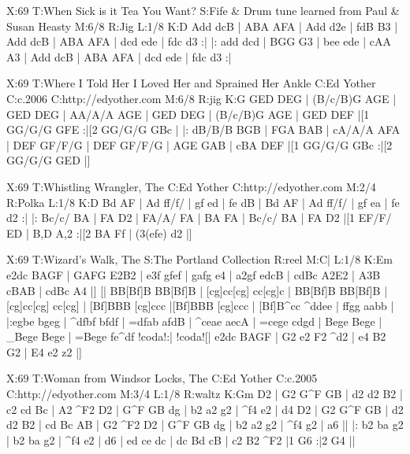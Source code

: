 \documentclass[letterpaper]{article}
\begin{document}
\begin{abc}[name]
X:69
T:When Sick is it Tea You Want?
S:Fife & Drum tune learned from Paul & Susan Heasty
M:6/8
R:Jig
L:1/8
K:D
Add dcB | ABA AFA | Add d2e | fdB B3 |
Add dcB | ABA AFA | dcd ede | fdc d3 :|
|: add dcd | BGG G3 | bee ede | cAA A3 |
Add dcB | ABA AFA | dcd ede | fdc d3 :|
\end{abc}

\begin{abc}[name]
X:69
T:Where I Told Her I Loved Her and Sprained Her Ankle
C:Ed Yother
C:c.2006
C:http://edyother.com
M:6/8
R:jig
K:G
GED DEG | (B/c/B)G AGE | GED DEG | AA/A/A AGE |
GED DEG | (B/c/B)G AGE | GED DEF |[1 GG/G/G GFE :|[2 GG/G/G GBc |
|: dB/B/B BGB | FGA BAB | cA/A/A AFA | DEF GF/F/G |
DEF GF/F/G | AGE GAB | cBA DEF |[1 GG/G/G GBc :|[2 GG/G/G GED |]
\end{abc}

\begin{abc}[name]
X:69
T:Whistling Wrangler, The
C:Ed Yother
C:http://edyother.com
M:2/4
R:Polka
L:1/8
K:D
Bd AF | Ad ff/f/ | gf ed | fe dB |
Bd AF | Ad ff/f/ | gf ea | fe d2 :|
|: Bc/c/ BA | FA D2 | FA/A/ FA | BA FA |
Bc/c/ BA | FA D2 |[1 EF/F/ ED | B,D A,2 :|[2 BA Ff | (3(efe) d2 |]
\end{abc}

\begin{abc}[name]
X:69
T:Wizard's Walk, The
S:The Portland Collection
R:reel
M:C|
L:1/8
K:Em
e2dc BAGF | GAFG E2B2 | e3f gfef | gafg e4 |
a2gf edcB | cdBc A2E2 | A3B cBAB | cdBc A4 |]
[| BB[Bf]B BB[Bf]B | [cg]cc[cg] cc[cg]c | BB[Bf]B BB[Bf]B | [cg]cc[cg] cc[cg] |  
[Bf]BBB [cg]ccc |[Bf]BBB [cg]ccc | [Bf]B^cc ^ddee | ffgg aabb |
|:egbe bgeg | ^dfbf bfdf | =dfab afdB | ^ceae aecA |
=cege cdgd | Bege Bege | _Bege Bege | =Bege fe^df !coda!:|
!coda![| e2dc BAGF | G2 e2 F2 ^d2 | e4 B2 G2 | E4 e2 z2 |] 
\end{abc}

\begin{abc}[name]
X:69
T:Woman from Windsor Locks, The
C:Ed Yother
C:c.2005
C:http://edyother.com
M:3/4
L:1/8
R:waltz
K:Gm
D2 | G2 G^F GB | d2 d2 B2 | c2 cd Bc | A2 ^F2 D2 |
G^F GB dg | b2 a2 g2 | ^f4 e2 | d4 D2 |
 G2 G^F GB | d2 d2 B2 | cd Bc AB | G2 ^F2 D2 |
G^F GB dg | b2 a2 g2 |  ^f4 g2 | a6 ||
|: b2 ba g2 | b2 ba g2 | ^f4 e2 | d6 |
ed ce dc | dc Bd cB | c2 B2 ^F2 |1 G6 :|2 G4 ||
\end{abc}
\end{document}
